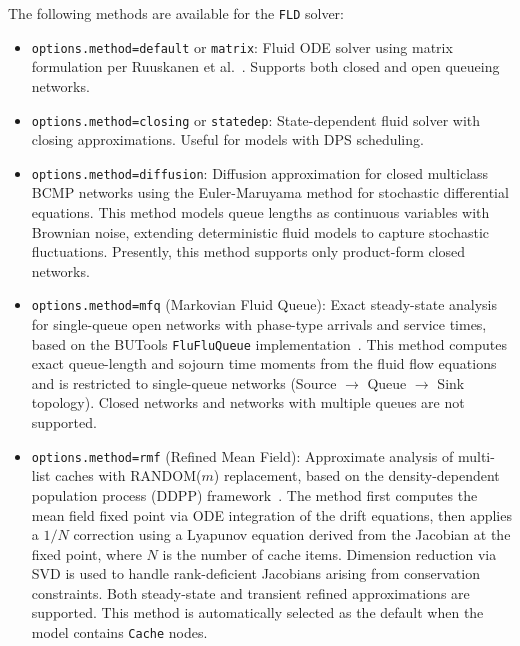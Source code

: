The following methods are available for the \texttt{FLD} solver:
\begin{itemize}
\item \texttt{options.method=default} or \texttt{matrix}: Fluid ODE solver using matrix formulation per Ruuskanen et al.~\cite{RuuskanenBAC21}. Supports both closed and open queueing networks.
\item \texttt{options.method=closing} or \texttt{statedep}: State-dependent fluid solver with closing approximations. Useful for models with DPS scheduling.
\item \texttt{options.method=diffusion}: Diffusion approximation for closed multiclass BCMP networks using the Euler-Maruyama method for stochastic differential equations. This method models queue lengths as continuous variables with Brownian noise, extending deterministic fluid models to capture stochastic fluctuations. Presently, this method supports only product-form closed networks. %
\item \texttt{options.method=mfq} (Markovian Fluid Queue): Exact steady-state analysis for single-queue open networks with phase-type arrivals and service times, based on the BUTools \texttt{FluFluQueue} implementation~\cite{Hor17}. This method computes exact queue-length and sojourn time moments from the fluid flow equations and is restricted to single-queue networks (Source $\to$ Queue $\to$ Sink topology). Closed networks and networks with multiple queues are not supported.
\item \texttt{options.method=rmf} (Refined Mean Field): Approximate analysis of multi-list caches with RANDOM($m$) replacement, based on the density-dependent population process (DDPP) framework~\cite{GastH16}. The method first computes the mean field fixed point via ODE integration of the drift equations, then applies a $1/N$ correction using a Lyapunov equation derived from the Jacobian at the fixed point, where $N$ is the number of cache items. Dimension reduction via SVD is used to handle rank-deficient Jacobians arising from conservation constraints. Both steady-state and transient refined approximations are supported. This method is automatically selected as the default when the model contains \texttt{Cache} nodes.
\end{itemize}

